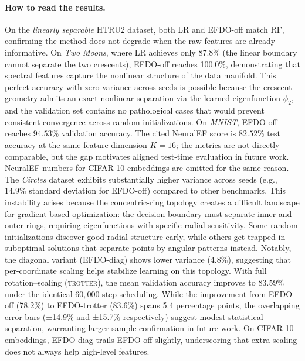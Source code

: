 \documentclass{article}
\theoremstyle{plain}
\theoremstyle{definition}
\theoremstyle{remark}
\newcommand{\new}[1]{#1}
\begin{document}
\paragraph{How to read the results.}
On the \emph{linearly separable} HTRU2 dataset, both LR and EFDO-off match RF,
confirming the method does not degrade when the raw features are already informative.
On \emph{Two Moons}, where LR achieves only 87.8\% (the linear boundary cannot separate the two crescents),
EFDO-off reaches 100.0\%, demonstrating that spectral features capture the nonlinear structure of the data manifold.
\new{This perfect accuracy with zero variance across seeds is possible because the crescent geometry admits an exact nonlinear separation via the learned eigenfunction $\phi_2$, and the validation set contains no pathological cases that would prevent consistent convergence across random initializations.}
On \emph{MNIST}, EFDO-off reaches \(94.53\%\) validation accuracy. The cited NeuralEF score is \(82.52\%\) test accuracy at the same feature dimension $K{=}16$; the metrics are not directly comparable, but the gap motivates aligned test-time evaluation in future work.
NeuralEF numbers for CIFAR-10 embeddings are omitted for the same reason.
\new{The \emph{Circles} dataset exhibits substantially higher variance across seeds (e.g., 14.9\% standard deviation for EFDO-off) compared to other benchmarks. This instability arises because the concentric-ring topology creates a difficult landscape for gradient-based optimization: the decision boundary must separate inner and outer rings, requiring eigenfunctions with specific radial sensitivity. Some random initializations discover good radial structure early, while others get trapped in suboptimal solutions that separate points by angular patterns instead. Notably, the diagonal variant (EFDO-diag) shows lower variance (4.8\%), suggesting that per-coordinate scaling helps stabilize learning on this topology. With full rotation--scaling (\textsc{trotter}), the mean validation accuracy improves to $83.59\%$ under the identical $60{,}000$-step scheduling.}
\new{While the improvement from EFDO-off (78.2\%) to EFDO-trotter (83.6\%) spans 5.4 percentage points, the overlapping error bars (±14.9\% and ±15.7\% respectively) suggest modest statistical separation, warranting larger-sample confirmation in future work.}
On CIFAR-10 embeddings, EFDO-diag trails EFDO-off slightly, underscoring that extra scaling does not always help high-level features.
\end{document}
